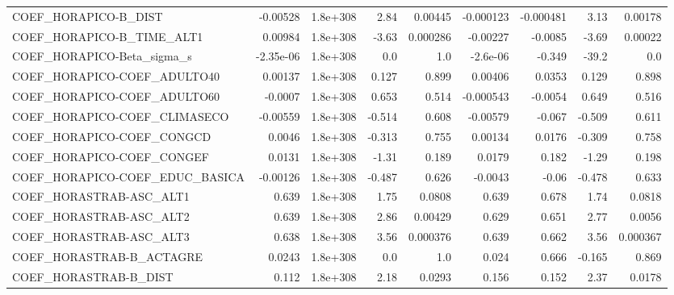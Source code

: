 \begin{tabular}{lrrrrrrrr}
COEF\_HORAPICO-B\_DIST              &    -0.00528 &     1.8e+308 &    2.84 &  0.00445 &  -0.000123 &   -0.000481 &         3.13 &       0.00178 \\
COEF\_HORAPICO-B\_TIME\_ALT1         &     0.00984 &     1.8e+308 &   -3.63 & 0.000286 &   -0.00227 &     -0.0085 &        -3.69 &       0.00022 \\
COEF\_HORAPICO-Beta\_sigma\_s        &   -2.35e-06 &     1.8e+308 &     0.0 &      1.0 &   -2.6e-06 &      -0.349 &        -39.2 &           0.0 \\
COEF\_HORAPICO-COEF\_ADULTO40       &     0.00137 &     1.8e+308 &   0.127 &    0.899 &    0.00406 &      0.0353 &        0.129 &         0.898 \\
COEF\_HORAPICO-COEF\_ADULTO60       &     -0.0007 &     1.8e+308 &   0.653 &    0.514 &  -0.000543 &     -0.0054 &        0.649 &         0.516 \\
COEF\_HORAPICO-COEF\_CLIMASECO      &    -0.00559 &     1.8e+308 &  -0.514 &    0.608 &   -0.00579 &      -0.067 &       -0.509 &         0.611 \\
COEF\_HORAPICO-COEF\_CONGCD         &      0.0046 &     1.8e+308 &  -0.313 &    0.755 &    0.00134 &      0.0176 &       -0.309 &         0.758 \\
COEF\_HORAPICO-COEF\_CONGEF         &      0.0131 &     1.8e+308 &   -1.31 &    0.189 &     0.0179 &       0.182 &        -1.29 &         0.198 \\
COEF\_HORAPICO-COEF\_EDUC\_BASICA    &    -0.00126 &     1.8e+308 &  -0.487 &    0.626 &    -0.0043 &       -0.06 &       -0.478 &         0.633 \\
COEF\_HORASTRAB-ASC\_ALT1           &       0.639 &     1.8e+308 &    1.75 &   0.0808 &      0.639 &       0.678 &         1.74 &        0.0818 \\
COEF\_HORASTRAB-ASC\_ALT2           &       0.639 &     1.8e+308 &    2.86 &  0.00429 &      0.629 &       0.651 &         2.77 &        0.0056 \\
COEF\_HORASTRAB-ASC\_ALT3           &       0.638 &     1.8e+308 &    3.56 & 0.000376 &      0.639 &       0.662 &         3.56 &      0.000367 \\
COEF\_HORASTRAB-B\_ACTAGRE          &      0.0243 &     1.8e+308 &     0.0 &      1.0 &      0.024 &       0.666 &       -0.165 &         0.869 \\
COEF\_HORASTRAB-B\_DIST             &       0.112 &     1.8e+308 &    2.18 &   0.0293 &      0.156 &       0.152 &         2.37 &        0.0178 \\

\end{tabular}
